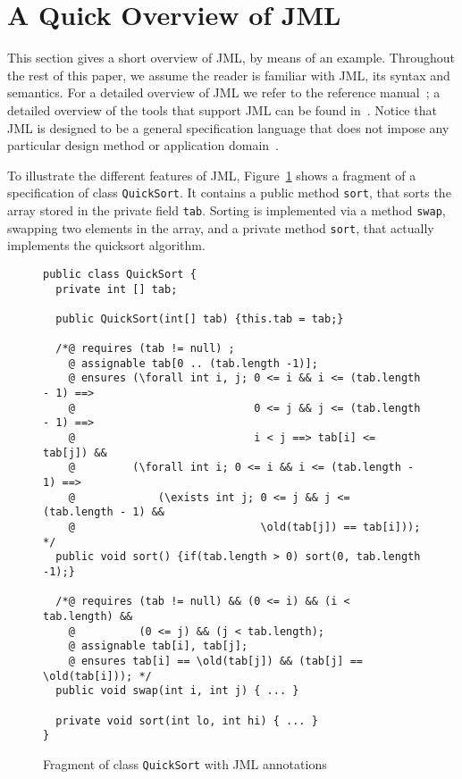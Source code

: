 \section{A Quick Overview of JML}\label{SecJML}



This section gives a short overview of JML, by means of an
example. Throughout the rest of this paper, we assume the reader is
familiar with JML, its syntax and semantics. For a detailed overview
of JML we refer to the reference manual~\cite{LeavensPCCRCK05}; a
detailed overview of the tools that support JML can be found
in~\cite{BurdyCCEKLLP03}.  Notice that JML is designed to be a general
specification language that does not impose any particular design
method or application domain~\cite{LeavensBR06}.



To illustrate the different features of JML, Figure~\ref{FigJMLSpec}
shows a fragment of a specification of class
\texttt{QuickSort}. It contains a public method
\texttt{sort}, that sorts the array stored in the private field
\texttt{tab}. Sorting is implemented via  a method \texttt{swap},
swapping two elements in the array, and a private method
\texttt{sort}, that actually implements the quicksort algorithm.

\begin{figure}[t!]
{\small
\begin{verbatim}
public class QuickSort {
  private int [] tab;

  public QuickSort(int[] tab) {this.tab = tab;}

  /*@ requires (tab != null) ;
    @ assignable tab[0 .. (tab.length -1)];
    @ ensures (\forall int i, j; 0 <= i && i <= (tab.length - 1) ==> 
    @                            0 <= j && j <= (tab.length - 1) ==>
    @                            i < j ==> tab[i] <= tab[j]) &&
    @         (\forall int i; 0 <= i && i <= (tab.length - 1) ==> 
    @             (\exists int j; 0 <= j && j <= (tab.length - 1) && 
    @                             \old(tab[j]) == tab[i])); */
  public void sort() {if(tab.length > 0) sort(0, tab.length -1);}

  /*@ requires (tab != null) && (0 <= i) && (i < tab.length) && 
    @          (0 <= j) && (j < tab.length);
    @ assignable tab[i], tab[j];
    @ ensures tab[i] == \old(tab[j]) && (tab[j] == \old(tab[i])); */
  public void swap(int i, int j) { ... }

  private void sort(int lo, int hi) { ... }
}
\end{verbatim}
}
\vspace*{-1em}\caption{Fragment of class \texttt{QuickSort} with JML annotations} 
\label{FigJMLSpec}
\end{figure}



